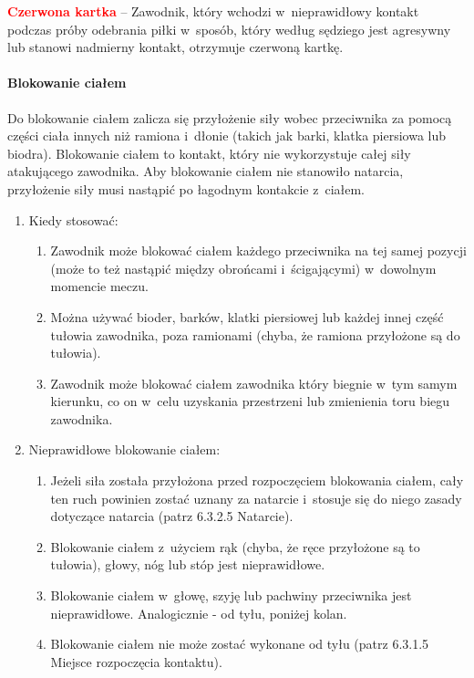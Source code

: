 \documentclass[12pt,a4paper]{article}
\newcommand\redcard[1]{\bgroup\textcolor{red}{\textbf{#1}}}
\begin{document}
\redcard{Czerwona kartka} -- Zawodnik, który wchodzi w~nieprawidłowy kontakt
podczas próby odebrania piłki w~sposób, który według sędziego jest
agresywny lub stanowi nadmierny kontakt, otrzymuje czerwoną kartkę.

\paragraph{Blokowanie ciałem}
Do blokowanie ciałem zalicza się
przyłożenie siły wobec przeciwnika za pomocą części ciała innych niż
ramiona i~dłonie (takich jak barki, klatka piersiowa lub biodra).
Blokowanie ciałem to kontakt, który nie wykorzystuje całej siły
atakującego zawodnika. Aby blokowanie ciałem nie stanowiło natarcia,
przyłożenie siły musi nastąpić po łagodnym kontakcie z~ciałem.

\begin{enumerate}
	\item
	      Kiedy stosować:

	      \begin{enumerate}
		      \item
		            Zawodnik może blokować ciałem każdego przeciwnika na tej samej
		            pozycji (może to też nastąpić między obrońcami i~ścigającymi) w~dowolnym momencie meczu.
		      \item
		            Można używać bioder, barków, klatki piersiowej lub każdej innej
		            część tułowia zawodnika, poza ramionami (chyba, że ramiona
		            przyłożone są do tułowia).
		      \item
		            Zawodnik może blokować ciałem zawodnika który biegnie w~tym samym
		            kierunku, co on w~celu uzyskania przestrzeni lub zmienienia toru
		            biegu zawodnika.
	      \end{enumerate}
	\item
	      Nieprawidłowe blokowanie ciałem:

	      \begin{enumerate}
		      \item
		            Jeżeli siła została przyłożona przed rozpoczęciem blokowania ciałem,
		            cały ten ruch powinien zostać uznany za natarcie i~stosuje się do
		            niego zasady dotyczące natarcia (patrz 6.3.2.5 Natarcie).
		      \item
		            Blokowanie ciałem z~użyciem rąk (chyba, że ręce przyłożone są to
		            tułowia), głowy, nóg lub stóp jest nieprawidłowe.
		      \item
		            Blokowanie ciałem w~głowę, szyję lub pachwiny przeciwnika jest
		            nieprawidłowe. Analogicznie - od tyłu, poniżej kolan.
		      \item
		            Blokowanie ciałem nie może zostać wykonane od tyłu (patrz 6.3.1.5
		            Miejsce rozpoczęcia kontaktu).
	      \end{enumerate}
\end{enumerate}
\end{document}
